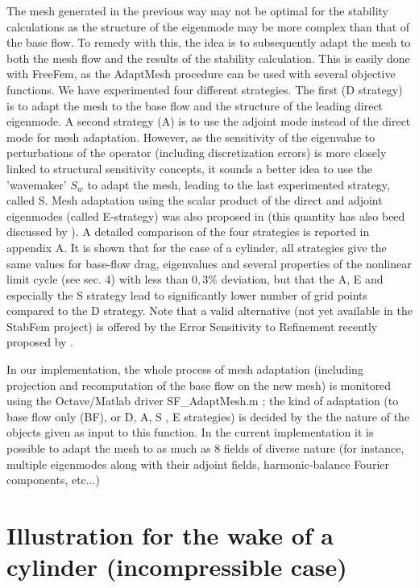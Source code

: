 \documentclass[twocolumn,10pt]{asme2ej}
\begin{document}
The mesh generated in the previous way may not be optimal for the stability calculations as the structure of the eigenmode may be more complex than that of the base flow. To remedy with this, the idea is to subsequently adapt the mesh to both the mesh flow and the results of the stability calculation. This is easily done with FreeFem, as the  AdaptMesh procedure can be used with several objective functions. We have experimented four different strategies. The first (D strategy) is to adapt the mesh to the base flow and the structure of the leading direct eigenmode. A second strategy (A) is to use the adjoint mode instead of the direct mode for mesh adaptation. However, as the sensitivity of the eigenvalue to perturbations of the operator (including discretization errors) is more closely linked to structural sensitivity concepts, it sounds a better idea to use the 'wavemaker' $S_w$ to adapt the mesh, leading to the last experimented strategy, called S. 
Mesh adaptation using the scalar product of the direct and adjoint eigenmodes  (called E-strategy) was also proposed in \cite{mavripilis2015adjoint} (this quantity has also beed discussed by \cite{marquet2015endogeneity}). A detailed comparison of the four strategies is reported in appendix A. It is shown that for the case of a cylinder, all strategies give the same values for base-flow drag, eigenvalues and several properties of the nonlinear limit cycle (see sec. 4) with less than $0,3\%$ deviation, but that the A, E and especially the S strategy lead to significantly lower number of grid points compared to the D strategy. 
Note that a valid alternative (not yet available in the StabFem  project) is offered by the Error Sensitivity to Refinement recently proposed by \cite{Luchini2017}. 




In our implementation, the whole process of mesh adaptation (including projection and recomputation of the base flow on the new mesh) is monitored using the Octave/Matlab driver {\sf  SF\_AdaptMesh.m} ; the kind of adaptation  (to base flow only (BF), or D, A, S , E strategies) is decided by the the nature of the objects given as input to this function. In the current implementation it is possible to adapt the mesh to as much as 8 fields of diverse nature (for instance, multiple eigenmodes along with their adjoint fields, harmonic-balance Fourier components, etc...)


\section{Illustration for the wake of a cylinder (incompressible case)}  
\vspace{.2cm}
\end{document}
